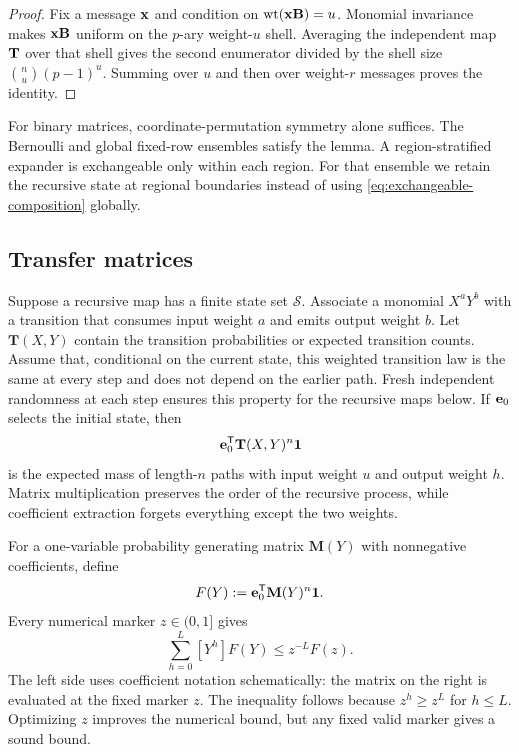 \begin{proof}
Fix a message $\mathbf x$ and condition on $\operatorname{wt}(\mathbf x\mathbf B)=u$.  Monomial invariance makes
$\mathbf x\mathbf B$ uniform on the $p$-ary weight-$u$ shell.  Averaging the independent
map $\mathbf T$ over that shell
gives the second enumerator divided by the shell size
$\binom{n}{u}(p-1)^u$.  Summing over $u$ and then over weight-$r$ messages
proves the identity.
\end{proof}

For binary matrices, coordinate-permutation symmetry alone suffices.  The
Bernoulli and global fixed-row ensembles satisfy the lemma.  A
region-stratified expander is exchangeable only within each region.  For that
ensemble we retain the recursive state at regional boundaries instead of
using \eqref{eq:exchangeable-composition} globally.

\subsection{Transfer matrices}

Suppose a recursive map has a finite state set $\mathcal S$.  Associate a
monomial $X^aY^b$ with a transition that consumes input weight $a$ and emits
output weight $b$.  Let $\mathbf T(X,Y)$ contain the transition probabilities
or expected transition counts.  Assume that, conditional on the current
state, this weighted transition law is the same at every step and does not
depend on the earlier path.  Fresh independent randomness at each step
ensures this property for the recursive maps below.
If $\mathbf e_0$ selects the initial state, then
\begin{equation}
 [X^uY^h]\,\e_0^{\mathsf T}\mathbf T(X,Y)^n\one
 \label{eq:transfer-coefficient}
\end{equation}
is the expected mass of length-$n$ paths with input weight $u$ and output
weight $h$.  Matrix multiplication preserves the order of the recursive
process, while coefficient extraction forgets everything except the two
weights.

For a one-variable probability generating matrix $\mathbf M(Y)$ with
nonnegative coefficients, define
\[
 F(Y):=\mathbf e_0^{\mathsf T}\mathbf M(Y)^n\mathbf 1.
\]
Every numerical marker $z\in(0,1]$ gives
\begin{equation}
 \sum_{h=0}^{L}[Y^h]F(Y)
 \leq z^{-L}F(z).
 \label{eq:positive-marker-tail}
\end{equation}
The left side uses coefficient notation schematically: the matrix on the
right is evaluated at the fixed marker $z$.  The inequality follows because
$z^h\geq z^L$ for $h\leq L$.  Optimizing $z$ improves the numerical bound,
but any fixed valid marker gives a sound bound.

